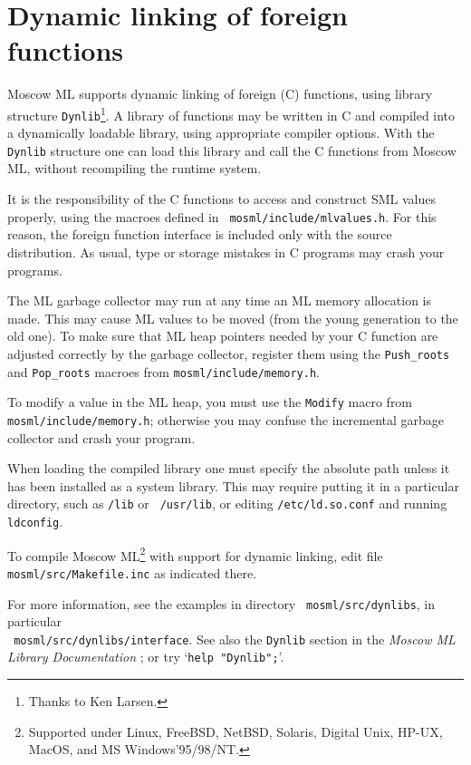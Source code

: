 \documentclass[fleqn,a4paper]{article}
\begin{document}
\section{Dynamic linking of foreign functions}
\label{sec-dynamic-linking}

Moscow ML supports dynamic linking of foreign (C) functions, using
library structure {\tt Dynlib}\footnote{Thanks to Ken Larsen.}.  A
library of functions may be written in C and compiled into a
dynamically loadable library, using appropriate compiler options.
With the {\tt Dynlib} structure one can load this library and call the
C functions from Moscow ML, without recompiling the runtime system.

It is the responsibility of the C functions to access and construct
SML values properly, using the macroes defined in {\tt
  mosml/include/mlvalues.h}.  For this reason, the foreign
function interface is included only with the source distribution.  As
usual, type or storage mistakes in C programs may crash your programs.

The ML garbage collector may run at any time an ML memory allocation
is made.  This may cause ML values to be moved (from the young
generation to the old one).  To make sure that ML heap pointers needed
by your C function are adjusted correctly by the garbage collector,
register them using the \verb+Push_roots+ and \verb+Pop_roots+ macroes
from {\tt mosml/include/memory.h}.

To modify a value in the ML heap, you must use the {\tt Modify} macro
from {\tt mosml/include/memory.h}; otherwise you may confuse the incremental
garbage collector and crash your program.

When loading the compiled library one must specify the absolute path
unless it has been installed as a system library.  This may require
putting it in a particular directory, such as {\tt /lib} or {\tt
  /usr/lib}, or editing {\tt /etc/ld.so.conf} and running {\tt
  ldconfig}.

To compile Moscow ML\footnote{Supported under Linux, FreeBSD, NetBSD,
  Solaris, Digital Unix, HP-UX, MacOS, and MS Windows'95/98/NT.} with
support for dynamic linking, edit file {\tt mosml/src/Makefile.inc} as
indicated there.

For more information, see the examples in directory {\tt
  mosml/src/dynlibs}, in particular\\ {\tt
  mosml/src/dynlibs/interface}\@.  See also the {\tt Dynlib} section
in the \emph{Moscow ML Library Documentation}
\cite{MoscowML:2000:MoscowMLLibrary}; or try `{\tt help "Dynlib";}'.
\end{document}
